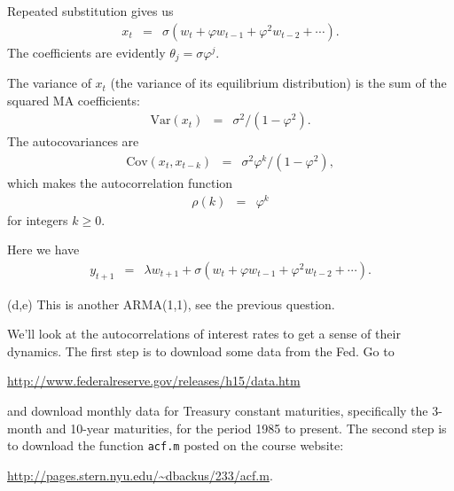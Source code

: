 \documentclass[11pt]{exam}
\begin{document}
\begin{questions}
\begin{solution}
\begin{parts}
\item Repeated substitution gives us
\begin{eqnarray*}
    x_t &=& \sigma (w_t + \varphi w_{t-1} + \varphi^2 w_{t-2} + \cdots) .
\end{eqnarray*}
The coefficients are evidently $\theta_j = \sigma \varphi^j$.
\item The variance of $x_t$ (the variance of its equilibrium distribution)
is the sum of the squared MA coefficients:
\begin{eqnarray*}
    \mbox{Var}(x_t) &=& \sigma^2 /(1-\varphi^2) .
\end{eqnarray*}
The autocovariances are
\begin{eqnarray*}
    \mbox{Cov}(x_t,x_{t-k}) &=& \sigma^2 \varphi^k /(1-\varphi^2) ,
\end{eqnarray*}
which makes the autocorrelation function
\begin{eqnarray*}
    \rho(k) &=& \varphi^k
\end{eqnarray*}
for integers $k \geq 0$.

\item Here we have
\begin{eqnarray*}
    y_{t+1} &=& \lambda w_{t+1} + \sigma (w_t + \varphi w_{t-1} + \varphi^2 w_{t-2} + \cdots) .
\end{eqnarray*}

\item [(d,e)] This is another ARMA(1,1), see the previous question.

\end{parts}
\end{solution}

We'll look at the autocorrelations of interest rates to get a sense
of their dynamics.
The first step is to download some data from the Fed.
Go to

\url{http://www.federalreserve.gov/releases/h15/data.htm}

and download monthly data for Treasury constant maturities,
specifically the 3-month and 10-year maturities,
for the period 1985 to present.
The second step is to download the function
{\tt acf.m} posted on the course website:

\url{http://pages.stern.nyu.edu/~dbackus/233/acf.m}.


\end{questions}
\end{document}
